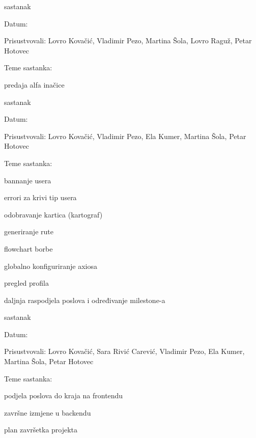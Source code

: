 \begin{packed_enum}
			
            \item  sastanak
			\item[] \begin{packed_item}
				\item Datum: 
				\item Prisustvovali: Lovro Kovačić, Vladimir Pezo, Martina Šola, Lovro Raguž, Petar Hotovec
				\item Teme sastanka:
				\begin{packed_item}
				    \item  predaja alfa inačice
				\end{packed_item}
			\end{packed_item}
			
            \item  sastanak
			\item[] \begin{packed_item}
				\item Datum: \DTMdisplaydate{2022}{12}{31}{-1}
				\item Prisustvovali: Lovro Kovačić, Vladimir Pezo, Ela Kumer, Martina Šola, Petar Hotovec
				\item Teme sastanka:
				\begin{packed_item}
				    \item  bannanje usera
				    \item  errori za krivi tip usera
				    \item  odobravanje kartica (kartograf)
				    \item  generiranje rute
				    \item  flowchart borbe
				  	\item  globalno konfiguriranje axiosa
				  	\item  pregled profila
				    \item  daljnja raspodjela poslova i određivanje milestone-a
				\end{packed_item}
			\end{packed_item}
			

            \item  sastanak
			\item[] \begin{packed_item}
				\item Datum: \DTMdisplaydate{2023}{1}{5}{-1}
				\item Prisustvovali: Lovro Kovačić, Sara Rivić Carević, Vladimir Pezo, Ela Kumer, Martina Šola, Petar Hotovec
				\item Teme sastanka:
				\begin{packed_item}
				    \item  podjela poslova do kraja na frontendu
				    \item  završne izmjene u backendu
				    \item  plan završetka projekta
				\end{packed_item}
			\end{packed_item}	
				

\end{packed_enum}
